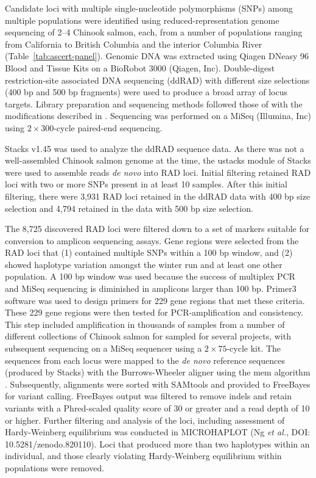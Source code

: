 Candidate loci with multiple single-nucleotide polymorphisms (SNPs) among multiple
populations were identified using reduced-representation genome sequencing of 2--4 Chinook salmon, each, from a number of
populations ranging from California to British
Columbia and the interior Columbia River (Table~\ref{tab:ascert-panel}).
Genomic DNA was extracted using Qiagen DNeasy 96 Blood and Tissue Kits on a BioRobot 3000
(Qiagen, Inc). Double-digest restriction-site associated DNA sequencing (ddRAD) with different size selections (400 bp and 500 bp
fragments) were used to produce a broad array of locus targets. Library preparation and sequencing methods followed those of
\citet{peterson2012double} with the modifications described in \citep{baetscher2018microhaplotypes}.
Sequencing was performed on a MiSeq (Illumina, Inc) using $2 \times 300$-cycle paired-end sequencing.

Stacks v1.45 \citep{catchen2013stacks} was used to analyze the ddRAD sequence data.  As there was not a well-assembled Chinook salmon genome
at the time, the ustacks module of Stacks were used to assemble reads {\em de novo} into RAD loci.  Initial filtering retained RAD loci with two or more SNPs present
in at least 10 samples. After this initial filtering, there were 3,931 RAD loci retained in the ddRAD data with 400 bp size selection and
4,794 retained in the data with 500 bp size selection.

The 8,725 discovered RAD loci were filtered down to a set of markers suitable for conversion
to amplicon sequencing assays. Gene regions were selected from the RAD loci that (1) contained multiple SNPs within a 100 bp window,
and (2) showed haplotype variation amongst the winter run and at least one other population.
A 100 bp window was used because the success of multiplex PCR and MiSeq sequencing is
diminished in amplicons larger than 100 bp. Primer3
software \citep{untergasser2012primer3} was used to design primers for 229 gene regions that met these criteria.
These 229 gene regions were then tested for PCR-amplification and consistency.  This step included
amplification in thousands of samples from a number of different collections of Chinook salmon for sampled
for several projects, with
subsequent sequencing on a
MiSeq sequencer using a $2\times 75$-cycle kit.
The sequences from each locus were mapped to the {\em de novo} reference sequences (produced by Stacks) with
the Burrows-Wheeler aligner using the mem algorithm \citep{bwa-mem2009}. 
Subsequently, alignments were sorted with SAMtools \citep{li2009sequence} and provided to
FreeBayes \citep{garrison2012haplotype} for variant calling.
FreeBayes output was filtered to remove indels and retain variants with a Phred-scaled quality score of 30
or greater and a read depth of 10 or higher. Further filtering and analysis of the loci, including
assessment of Hardy-Weinberg equilibrium \citep{hardy1908mendelian} was conducted in MICROHAPLOT (Ng {\em et al.}, DOI: 10.5281/zenodo.820110).  Loci that produced more than two haplotypes within an individual, and those clearly violating Hardy-Weinberg equilibrium within populations were removed.


